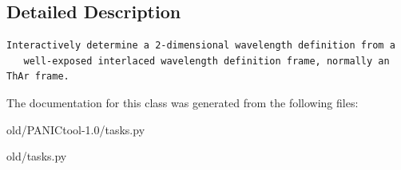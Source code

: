 \subsection{Detailed Description}


\footnotesize\begin{verbatim}Interactively determine a 2-dimensional wavelength definition from a
   well-exposed interlaced wavelength definition frame, normally an ThAr frame.
\end{verbatim}
\normalsize
 



The documentation for this class was generated from the following files:\begin{CompactItemize}
\item 
old/PANICtool-1.0/tasks.py\item 
old/tasks.py\end{CompactItemize}
